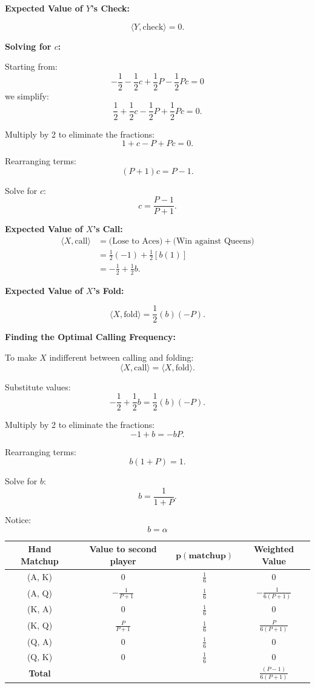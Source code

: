\documentclass[12pt]{article}
\begin{document}
\noindent\textbf{Expected Value of \( Y \)'s Check:}

\[
    \langle Y, \text{check} \rangle = 0.
\]

\noindent\textbf{Solving for \( c \):}

Starting from: $$-\frac{1}{2} - \frac{1}{2}c + \frac{1}{2}P - \frac{1}{2}Pc = 0$$ we simplify: $$\frac{1}{2} + \frac{1}{2}c - \frac{1}{2}P + \frac{1}{2}Pc = 0.$$

Multiply by 2 to eliminate the fractions:
\[
    1 + c - P + Pc = 0.
\]

Rearranging terms:
\[
    (P + 1)c = P - 1.
\]

Solve for \( c \):
\[
    c = \frac{P - 1}{P + 1}.
\]

\noindent\textbf{Expected Value of \( X \)'s Call:}
\begin{align*}
    \langle X, \text{call} \rangle &= \text{(Lose to Aces)} + \text{(Win against Queens)} \\
    &= \frac{1}{2}(-1) + \frac{1}{2}[b(1)] \\
    &= -\frac{1}{2} + \frac{1}{2}b.
\end{align*}

\noindent\textbf{Expected Value of \( X \)'s Fold:}

\[
    \langle X, \text{fold} \rangle = \frac{1}{2}(b)(-P).
\]

\noindent\textbf{Finding the Optimal Calling Frequency:}

To make \( X \) indifferent between calling and folding:
\[
    \langle X, \text{call} \rangle = \langle X, \text{fold} \rangle.
\]

Substitute values:
\[
    -\frac{1}{2} + \frac{1}{2}b = \frac{1}{2}(b)(-P).
\]

Multiply by 2 to eliminate the fractions:
\[
    -1 + b = -bP.
\]

Rearranging terms:
\[
    b(1 + P) = 1.
\]

Solve for \( b \):
\[
    b = \frac{1}{1 + P}.
\]

\noindent Notice:
\[
b = \alpha
\]

\begin{table}
\centering
\begin{tabular}{|c|c|c|c|}
\hline
\textbf{Hand Matchup} & \textbf{Value to second player} & \(\mathbf{p(\text{matchup})}\) & \textbf{Weighted Value} \\ \hline
(A, K) & 0 & \(\frac{1}{6}\) & 0 \\ \hline
(A, Q) & \(-\frac{1}{P+1}\) & \(\frac{1}{6}\) & \(-\frac{1}{6(P+1)}\) \\ \hline
(K, A) & 0 & \(\frac{1}{6}\) & 0 \\ \hline
(K, Q) & \(\frac{P}{P+1}\) & \(\frac{1}{6}\) & \(\frac{P}{6(P+1)}\) \\ \hline
(Q, A) & 0 & \(\frac{1}{6}\) & 0 \\ \hline
(Q, K) & 0 & \(\frac{1}{6}\) & 0 \\ \hline
\textbf{Total} & & & \(\frac{(P-1)}{6(P+1)}\) \\ \hline
\end{tabular}
\label{table:hand_matchup}
\end{table}
\end{document}
